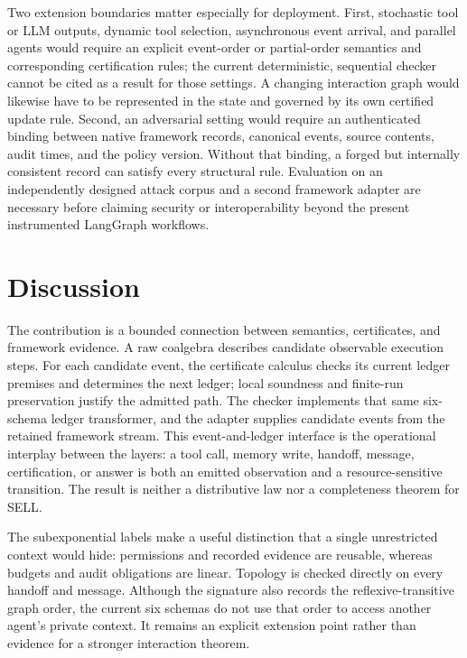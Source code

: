 \documentclass[a4paper,fleqn]{cas-sc}
\begin{document}
Two extension boundaries matter especially for deployment. First,
stochastic tool or LLM outputs, dynamic tool selection, asynchronous event
arrival, and parallel agents would require an explicit event-order or
partial-order semantics and corresponding certification rules; the current
deterministic, sequential checker cannot be cited as a result for those
settings. A changing interaction graph would likewise have to be represented
in the state and governed by its own certified update rule. Second, an
adversarial setting would require an authenticated binding between native
framework records, canonical events, source contents, audit times, and the
policy version. Without that binding, a forged but internally consistent
record can satisfy every structural rule. Evaluation on an independently
designed attack corpus and a second framework adapter are necessary before
claiming security or interoperability beyond the present instrumented
LangGraph workflows.

\section{Discussion}

The contribution is a bounded connection between semantics, certificates, and
framework evidence. A raw coalgebra describes candidate observable execution
steps. For each candidate event, the certificate calculus checks its current
ledger premises and determines the next ledger; local soundness and finite-run
preservation justify the admitted path. The checker implements that same
six-schema ledger transformer, and the adapter supplies candidate events from
the retained framework stream. This event-and-ledger interface is the
operational interplay between the layers: a tool call, memory write, handoff,
message, certification, or answer is both an emitted observation and a
resource-sensitive transition. The result is neither a distributive law nor a
completeness theorem for SELL.

The subexponential labels make a useful distinction that a single unrestricted
context would hide: permissions and recorded evidence are reusable, whereas
budgets and audit obligations are linear. Topology is checked directly on every
handoff and message. Although the signature also records the
reflexive-transitive graph order, the current six schemas do not use that order
to access another agent's private context. It remains an explicit extension
point rather than evidence for a stronger interaction theorem.
\end{document}
